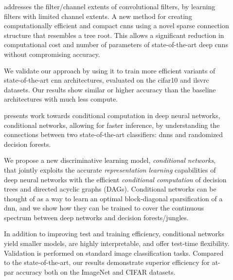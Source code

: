 \documentclass[thesis]{subfiles}
\begin{document}
\begin{description}
	\item[] addresses the filter/channel extents of convolutional filters, by learning filters with limited channel extents. A new method for creating computationally efficient and compact \glspl{cnn} using a novel sparse connection structure that resembles a tree root. This allows a significant reduction in computational cost and number of parameters of state-of-the-art deep \glspl{cnn} without compromising accuracy. 
	
	We validate our approach by using it to train more efficient variants of state-of-the-art \gls{cnn} architectures, evaluated on the \gls{cifar10} and \gls{ilsvrc} datasets. Our results show similar or higher accuracy than the baseline architectures with much less compute. %
	
	\item[] presents work towards conditional computation in deep neural networks, conditional networks, allowing for faster inference, by understanding the connections between two state-of-the-art classifiers: \glspl{dnn} and randomized decision forests.
	
	We propose a new discriminative learning model, \emph{conditional networks}, 
	that jointly exploits the accurate \emph{representation learning} capabilities of deep neural networks with the efficient \emph{conditional computation} of decision trees and directed acyclic graphs (DAGs).
	Conditional networks can be thought of as a way to learn an optimal block-diagonal sparsification of a \gls{dnn}, and we show how they can be trained to cover the continuous spectrum between deep networks and decision forests/jungles. 
	
	In addition to improving test and training efficiency, conditional networks yield smaller models, are highly interpretable, and offer test-time flexibility. Validation is performed on standard image classification tasks. Compared to the state-of-the-art, our results demonstrate superior efficiency for at-par accuracy both on the ImageNet and CIFAR datasets.
	

\end{description}
\end{document}
